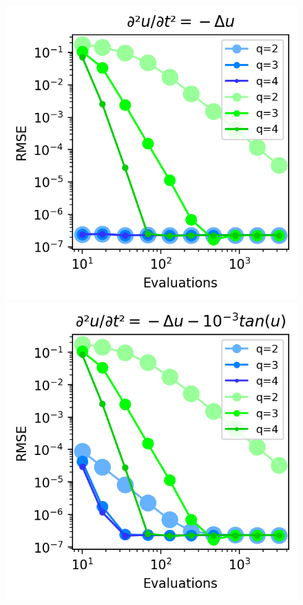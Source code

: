 \begin{figure}
    \includegraphics[width=\columnwidth]{../images/solver_wave.png}
    \caption{}
    \label{fig:wave}
    \includegraphics[width=\columnwidth]{../images/solver_wave and medium tan.png}

\end{figure}
